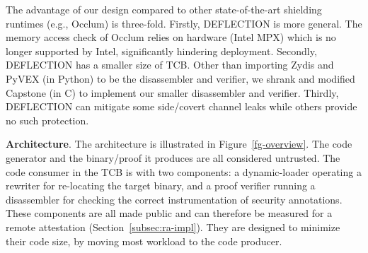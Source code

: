 The advantage of our design compared to other state-of-the-art shielding runtimes (e.g., Occlum) is three-fold. Firstly, DEFLECTION is more general. The memory access check of Occlum relies on hardware (Intel MPX) which is no longer supported by Intel, significantly hindering deployment. Secondly, DEFLECTION has a smaller size of TCB. Other than importing Zydis and PyVEX (in Python) to be the disassembler and verifier, we shrank and modified Capstone (in C) to implement our smaller disassembler and verifier. Thirdly, DEFLECTION can mitigate some side/covert channel leaks while others provide no such protection.






\vspace{3pt}\noindent\textbf{Architecture}. The architecture is illustrated in Figure~\ref{fg-overview}. The code generator and the binary/proof it produces are all considered untrusted. The code consumer in the TCB is with two components: a dynamic-loader operating a rewriter for re-locating the target binary, and a proof verifier running a disassembler for checking the correct instrumentation of security annotations. These components are all made public and can therefore be measured for a remote attestation (Section~\ref{subsec:ra-impl}). They are designed to minimize their code size, by moving most workload to the code producer. 

